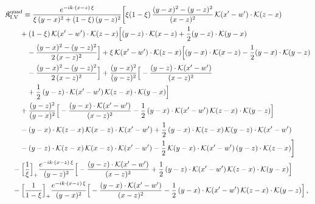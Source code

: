 \begingroup\small
\begin{align}\label{eq:K-rm_quad_rm_I_V}
&\mathfrak{K}^{\rm quad}_{\rm I.V}\equiv \frac{e^{-ik\cdot(x-z)\,\xi}}{\xi\,(y-x)^{2}+(1-\xi)\,(y-z)^{2}}\bigg[\xi(1-\xi)\, \frac{(y-x)^{2}-(y-z)^{2}}{(x-z)^{2}}\, \mathcal{K}(x'-w')\cdot\mathcal{K}(z-x)\notag\\
&\quad\quad +(1-\xi)\, \mathcal{K}(x'-w')\cdot\mathcal{K}(z-x)\Big[(y-z)\cdot\mathcal{K}(x-z) +\frac{1}{2}(y-z)\cdot\mathcal{K}(y-x)\notag\\
&\quad\quad\quad -\frac{(y-x)^{2}-(y-z)^{2}}{2\,(x-z)^{2}}\Big] +\xi\, \mathcal{K}(x'-w')\cdot\mathcal{K}(z-x)\Big[(y-x)\cdot\mathcal{K}(x-z) -\frac{1}{2}(y-x)\cdot\mathcal{K}(y-z)\notag\\
&\quad\quad\quad -\frac{(y-x)^{2}-(y-z)^{2}}{2\,(x-z)^{2}}\Big] +\frac{(y-x)^{2}}{(y-z)^{2}}\Big[-\frac{(y-z)\cdot\mathcal{K}(x'-w')}{(x-z)^{2}}\notag\\
&\quad\quad\quad +\frac{1}{2}\, (y-z)\cdot\mathcal{K}(x'-w')\, \mathcal{K}(z-x)\cdot\mathcal{K}(y-x)\Big]\notag\\
&\quad\quad +\frac{(y-z)^{2}}{(y-x)^{2}}\Big[-\frac{(y-x)\cdot\mathcal{K}(x'-w')}{(x-z)^{2}} -\frac{1}{2}\, (y-x)\cdot\mathcal{K}(x'-w')\, \mathcal{K}(z-x)\cdot\mathcal{K}(y-z)\Big]\notag\\
&\quad\quad -(y-x)\cdot\mathcal{K}(z-x)\, \mathcal{K}(x-z)\cdot\mathcal{K}(x'-w') +\frac{1}{2}\, (y-x)\cdot\mathcal{K}(z-x)\, \mathcal{K}(y-z)\cdot\mathcal{K}(x'-w')\notag\\
&\quad\quad -(y-z)\cdot\mathcal{K}(z-x)\, \mathcal{K}(x-z)\cdot\mathcal{K}(x'-w') -\frac{1}{2}\, \mathcal{K}(y-x)\cdot\mathcal{K}(x'-w')\, (y-z)\cdot\mathcal{K}(z-x)\bigg]\notag\\
&\quad -\Big[\frac{1}{\xi}\Big]_{+}\frac{e^{-ik\cdot(x-z)\,\xi}}{(y-z)^{2}}\Big[-\frac{(y-z)\cdot\mathcal{K}(x'-w')}{(x-z)^{2}} +\frac{1}{2}\, (y-z)\cdot\mathcal{K}(x'-w')\, \mathcal{K}(z-x)\cdot\mathcal{K}(y-x)\Big]\notag\\
&\quad -\Big[\frac{1}{1-\xi}\Big]_{+}\frac{e^{-ik\cdot(x-z)\,\xi}}{(y-x)^{2}}\Big[-\frac{(y-x)\cdot\mathcal{K}(x'-w')}{(x-z)^{2}} -\frac{1}{2}\, (y-x)\cdot\mathcal{K}(x'-w')\, \mathcal{K}(z-x)\cdot\mathcal{K}(y-z)\Big]\,,
\end{align}
\endgroup
